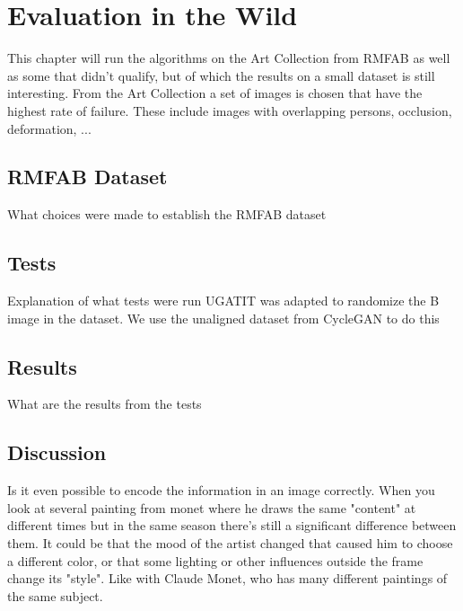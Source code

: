\chapter{Evaluation in the Wild}
This chapter will run the algorithms on the Art Collection from \gls{RMFAB}
as well as some that didn't qualify, but of which the results on a small dataset is still interesting.
From the Art Collection a set of images is chosen that have the highest rate of failure.
These include images with overlapping persons, occlusion, deformation, ...

\section{RMFAB Dataset}
What choices were made to establish the RMFAB dataset

\section{Tests}

Explanation of what tests were run
UGATIT was adapted to randomize the B image in the dataset.
We use the unaligned dataset from CycleGAN to do this

\section{Results}
What are the results from the tests

\section{Discussion}
Is it even possible to encode the information in an image correctly.
When you look at several painting from monet where he draws the same "content" at different times but in the same season there's still a significant difference between them.
It could be that the mood of the artist changed that caused him to choose a different color, or that some lighting or other influences outside the frame change its "style".
Like with Claude Monet, who has many different paintings of the same subject.   